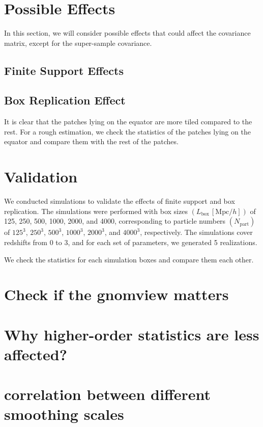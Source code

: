 \section{Possible Effects}
In this section, we will consider possible effects that could affect the covariance matrix, except for the super-sample covariance.
\subsection{Finite Support Effects}

\subsection{Box Replication Effect}
It is clear that the patches lying on the equator are more tiled compared to the rest. For a rough estimation, we check the statistics of the patches lying on the equator and compare them with the rest of the patches.

\section{Validation}
We conducted simulations to validate the effects of finite support and box replication. The simulations were performed with box sizes $(L_{\text{box}}\, [\mathrm{Mpc}/h])$ of 125, 250, 500, 1000, 2000, and 4000, corresponding to particle numbers $(N_{\text{part}})$ of $125^3$, $250^3$, $500^3$, $1000^3$, $2000^3$, and $4000^3$, respectively. The simulations cover redshifts from $0$ to $3$, and for each set of parameters, we generated 5 realizations.

We check the statistics for each simulation boxes and compare them each other.



\section{Check if the gnomview matters}

\section{Why higher-order statistics are less affected?}

\section{correlation between different smoothing scales}




